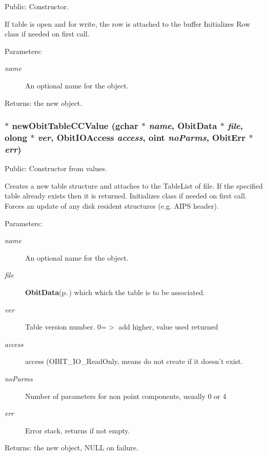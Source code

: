 Public: Constructor. 

If table is open and for write, the row is attached to the buffer Initializes Row class if needed on first call. \begin{Desc}
\item[Parameters:]
\begin{description}
\item[{\em name}]An optional name for the object. \end{description}
\end{Desc}
\begin{Desc}
\item[Returns:]the new object. \end{Desc}
\subsubsection{$\ast$ new\-Obit\-Table\-CCValue (gchar $\ast$ {\em name}, {\bf Obit\-Data} $\ast$ {\em file}, {\bf olong} $\ast$ {\em ver}, Obit\-IOAccess {\em access}, {\bf oint} {\em no\-Parms}, {\bf Obit\-Err} $\ast$ {\em err})}\label{ObitTableCC_8h_a12}


Public: Constructor from values. 

Creates a new table structure and attaches to the Table\-List of file. If the specified table already exists then it is returned. Initializes class if needed on first call. Forces an update of any disk resident structures (e.g. AIPS header). \begin{Desc}
\item[Parameters:]
\begin{description}
\item[{\em name}]An optional name for the object. \item[{\em file}]{\bf Obit\-Data}{\rm (p.\,\pageref{structObitData})} which which the table is to be associated. \item[{\em ver}]Table version number. 0=$>$ add higher, value used returned \item[{\em access}]access (OBIT\_\-IO\_\-Read\-Only, means do not create if it doesn't exist. \item[{\em no\-Parms}]Number of parameters for non point components, usually 0 or 4 \item[{\em err}]Error stack, returns if not empty. \end{description}
\end{Desc}
\begin{Desc}
\item[Returns:]the new object, NULL on failure. \end{Desc}

